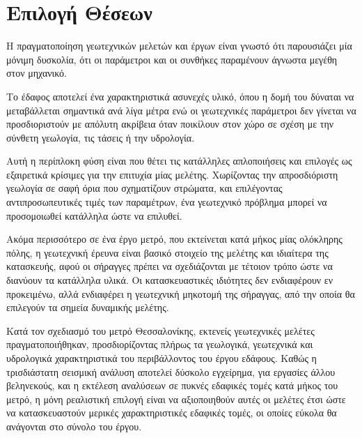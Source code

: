 \section{Επιλογή Θέσεων}
\label{sbs:KPs}

Η πραγματοποίηση γεωτεχνικών μελετών και έργων είναι γνωστό ότι παρουσιάζει μία μόνιμη δυσκολία, ότι οι παράμετροι και οι συνθήκες παραμένουν άγνωστα μεγέθη στον μηχανικό.

Το έδαφος αποτελεί ένα χαρακτηριστικά ασυνεχές υλικό, όπου η δομή του δύναται να μεταβάλλεται σημαντικά ανά λίγα μέτρα ενώ οι γεωτεχνικές παράμετροι δεν γίνεται να προσδιοριστούν με απόλυτη ακρίβεια όταν ποικίλουν στον χώρο σε σχέση με την σύνθετη γεωλογία, τις τάσεις ή την υδρολογία.

Αυτή η περίπλοκη φύση είναι που θέτει τις κατάλληλες απλοποιήσεις και επιλογές ως εξαιρετικά κρίσιμες για την επιτυχία μίας μελέτης. Χωρίζοντας την απροσδιόριστη γεωλογία σε σαφή όρια που σχηματίζουν στρώματα, και επιλέγοντας αντιπροσωπευτικές τιμές των παραμέτρων, ένα γεωτεχνικό πρόβλημα μπορεί να προσομοιωθεί κατάλληλα ώστε να επιλυθεί.

Ακόμα περισσότερο σε ένα έργο μετρό, που εκτείνεται κατά μήκος μίας ολόκληρης πόλης, η γεωτεχνική έρευνα είναι βασικό στοιχείο της μελέτης και ιδιαίτερα της κατασκευής, αφού οι σήραγγες πρέπει να σχεδιάζονται με τέτοιον τρόπο ώστε να διανύουν τα κατάλληλα υλικά. Οι κατασκευαστικές ιδιότητες δεν ενδιαφέρουν εν προκειμένω, αλλά ενδιαφέρει η γεωτεχνική μηκοτομή της σήραγγας, από την οποία θα επιλεγούν τα σημεία δυναμικής μελέτης.

Κατά τον σχεδιασμό του μετρό Θεσσαλονίκης, εκτενείς γεωτεχνικές μελέτες πραγματοποιήθηκαν, προσδιορίζοντας πλήρως τα γεωλογικά, γεωτεχνικά και υδρολογικά χαρακτηριστικά του περιβάλλοντος του έργου εδάφους. Καθώς η τρισδιάστατη σεισμική ανάλυση αποτελεί δύσκολο εγχείρημα, για εργασίες άλλου βεληνεκούς, και η εκτέλεση αναλύσεων σε πυκνές εδαφικές τομές κατά μήκος του μετρό, η μόνη ρεαλιστική επιλογή είναι να αξιοποιηθούν αυτές οι μελέτες έτσι ώστε να κατασκευαστούν μερικές χαρακτηριστικές εδαφικές τομές, οι οποίες εύκολα θα ανάγονται στο σύνολο του έργου.

